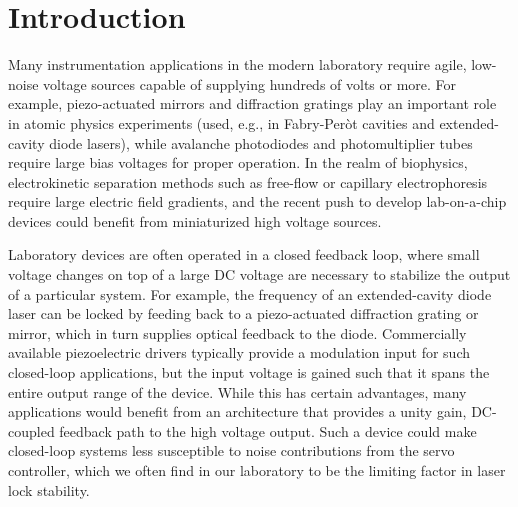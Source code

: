 \documentclass[aip,rsi,reprint]{revtex4-1} %
\begin{document}
\pacs{}%

\maketitle %

\section{Introduction}
\label{Sec:Introduction}

Many instrumentation applications in the modern laboratory require agile, low-noise voltage sources capable of supplying hundreds of volts or more.
For example, piezo-actuated mirrors and diffraction gratings play an important role in atomic physics experiments (used, e.g., in Fabry-Per{\`o}t cavities\cite{Riedle1994a,Bohlouli-Zanjani2006a} and extended-cavity diode lasers\cite{Wieman1991a}), while avalanche photodiodes and photomultiplier tubes require large bias voltages for proper operation.
In the realm of biophysics, electrokinetic separation methods such as free-flow or capillary electrophoresis\cite{Kohlheyer2008a} require large electric field gradients, and the recent push to develop lab-on-a-chip devices could benefit from miniaturized high voltage sources\cite{Temiz2015a}.

Laboratory devices are often operated in a closed feedback loop, where small voltage changes on top of a large DC voltage are necessary to stabilize the output of a particular system.
For example, the frequency of an extended-cavity diode laser can be locked by feeding back to a piezo-actuated diffraction grating or mirror, which in turn supplies optical feedback to the diode.
Commercially available piezoelectric drivers typically provide a modulation input for  such closed-loop applications, but the input voltage is gained such that it spans the entire output range of the device.
While this has certain advantages, many applications would benefit from an architecture that provides a unity gain, DC-coupled feedback path to the high voltage output. 
Such a device could make closed-loop systems less susceptible to noise contributions from the servo controller, which we often find in our laboratory to be the limiting factor in laser lock stability.
\end{document}
